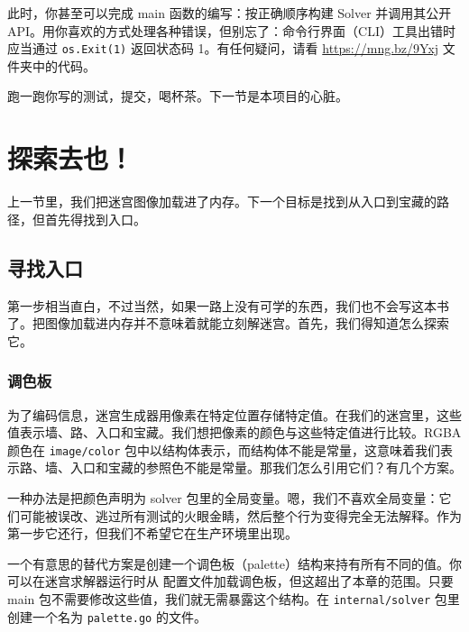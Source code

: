 此时，你甚至可以完成 main 函数的编写：按正确顺序构建 Solver 并调用其公开 API。用你喜欢的方式处理各种错误，但别忘了：命令行界面（CLI）工具出错时应当通过 \texttt{os.Exit(1)} 返回状态码 1。有任何疑问，请看 \url{https://mng.bz/9Yxj} 文件夹中的代码。

跑一跑你写的测试，提交，喝杯茶。下一节是本项目的心脏。

\section{探索去也！}

上一节里，我们把迷宫图像加载进了内存。下一个目标是找到从入口到宝藏的路径，但首先得找到入口。

\subsection{寻找入口}

第一步相当直白，不过当然，如果一路上没有可学的东西，我们也不会写这本书了。把图像加载进内存并不意味着就能立刻解迷宫。首先，我们得知道怎么探索它。

\subsubsection*{调色板}

为了编码信息，迷宫生成器用像素在特定位置存储特定值。在我们的迷宫里，这些值表示墙、路、入口和宝藏。我们想把像素的颜色与这些特定值进行比较。RGBA 颜色在 \texttt{image/color} 包中以结构体表示，而结构体不能是常量，这意味着我们表示路、墙、入口和宝藏的参照色不能是常量。那我们怎么引用它们？有几个方案。

一种办法是把颜色声明为 solver 包里的全局变量。嗯，我们不喜欢全局变量：它们可能被误改、逃过所有测试的火眼金睛，然后整个行为变得完全无法解释。作为第一步它还行，但我们不希望它在生产环境里出现。

一个有意思的替代方案是创建一个调色板（palette）结构来持有所有不同的值。你可以在迷宫求解器运行时从
配置文件加载调色板，但这超出了本章的范围。只要 main 包不需要修改这些值，我们就无需暴露这个结构。在 \texttt{internal/solver} 包里创建一个名为 \texttt{palette.go} 的文件。


